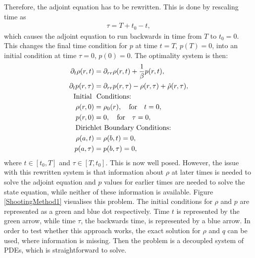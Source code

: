 Therefore, the adjoint equation has to be rewritten. This is done by rescaling time as
\begin{align*}
\tau=T+t_0-t,
\end{align*}
which causes the adjoint equation to run backwards in time from $T$ to $t_0=0$. This changes the final time condition for $p$ at time $t=T$, $p(T)=0$, into an initial condition at time $\tau =0$, ${p}(0)=0$.
The optimality system is then:
\begin{align} \label{sysOptimDiffAdjBW1}
\partial_t \rho(r,t) &= \partial_{rr} \rho(r,t) + \frac{1}{\beta}{p}(r,t), \\
\partial_t {p}(r,\tau) &=\partial_{rr} {p}(r,\tau) - \rho(r,\tau) +\hat{\rho}(r,\tau), \notag \\
\text{Initial   } & \text{ Conditions:} \notag  \\
 \rho(r,0)&=\rho_0(r),  \quad \text{for} \quad t=0,\notag \\
{p}(r,0) &=0, \quad \text{for} \quad \tau=0,\notag \\
\text{Dirich} &\text{let Boundary Conditions:} \notag \\
\rho(a,t) &=\rho(b,t)=0, \notag \\
{p}(a,\tau) &={p}(b,\tau)=0, \notag 
\end{align} 
where $t \in [t_0,T]$ and $\tau \in [T,t_0]$.
This is now well posed. However, the issue with this rewritten system is that information about $\rho$ at later times is needed to solve the adjoint equation and ${p}$ values for earlier times are needed to solve the state equation, while neither of these information is available. Figure \ref{ShootingMethod1} visualises this problem. The initial conditions for $\rho$ and $p$ are represented as a green and blue dot respectively. Time $t$ is represented by the green arrow, while time $\tau$, the backwards time, is represented by a blue arrow. In order to test whether this approach works, the exact solution for $\rho$ and $q$ can be used, where information is missing. Then the problem is a decoupled system of PDEs, which is straightforward to solve.  




